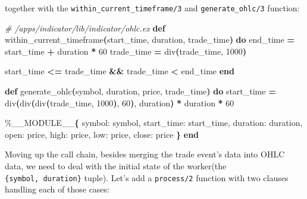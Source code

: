 \documentclass[
  oneside]{book}
\newenvironment{Shaded}{\begin{snugshade}}{\end{snugshade}}
\newcommand{\CommentTok}[1]{\textcolor[rgb]{0.56,0.35,0.01}{\textit{#1}}}
\newcommand{\ConstantTok}[1]{\textcolor[rgb]{0.56,0.35,0.01}{#1}}
\newcommand{\DecValTok}[1]{\textcolor[rgb]{0.00,0.00,0.81}{#1}}
\newcommand{\FunctionTok}[1]{\textcolor[rgb]{0.13,0.29,0.53}{\textbf{#1}}}
\newcommand{\KeywordTok}[1]{\textcolor[rgb]{0.13,0.29,0.53}{\textbf{#1}}}
\newcommand{\NormalTok}[1]{#1}
\newcommand{\OperatorTok}[1]{\textcolor[rgb]{0.81,0.36,0.00}{\textbf{#1}}}
\newcommand{\VariableTok}[1]{\textcolor[rgb]{0.00,0.00,0.00}{#1}}
\begin{document}
together with the \texttt{within\_current\_timeframe/3} and \texttt{generate\_ohlc/3} function:

\begin{Shaded}
\begin{Highlighting}[]
\CommentTok{\# /apps/indicator/lib/indicator/ohlc.ex}
  \KeywordTok{def}\NormalTok{ within\_current\_timeframe}\FunctionTok{(}\NormalTok{start\_time, duration, trade\_time}\FunctionTok{)} \KeywordTok{do}
\NormalTok{    end\_time }\OperatorTok{=}\NormalTok{ start\_time }\OperatorTok{+}\NormalTok{ duration }\OperatorTok{*} \DecValTok{60}
\NormalTok{    trade\_time }\OperatorTok{=}\NormalTok{ div}\FunctionTok{(}\NormalTok{trade\_time, }\DecValTok{1000}\FunctionTok{)}

\NormalTok{    start\_time }\OperatorTok{\textless{}=}\NormalTok{ trade\_time }\OperatorTok{\&\&}\NormalTok{ trade\_time }\OperatorTok{\textless{}}\NormalTok{ end\_time}
  \KeywordTok{end}
  
  \KeywordTok{def}\NormalTok{ generate\_ohlc}\FunctionTok{(}\NormalTok{symbol, duration, price, trade\_time}\FunctionTok{)} \KeywordTok{do}
\NormalTok{    start\_time }\OperatorTok{=}\NormalTok{ div}\FunctionTok{(}\NormalTok{div}\FunctionTok{(}\NormalTok{div}\FunctionTok{(}\NormalTok{trade\_time, }\DecValTok{1000}\FunctionTok{)}\NormalTok{, }\DecValTok{60}\FunctionTok{)}\NormalTok{, duration}\FunctionTok{)} \OperatorTok{*}\NormalTok{ duration }\OperatorTok{*} \DecValTok{60}

\NormalTok{    \%}\ConstantTok{\_\_MODULE\_\_}\FunctionTok{\{}
      \VariableTok{symbol:}\NormalTok{ symbol,}
      \VariableTok{start\_time:}\NormalTok{ start\_time,}
      \VariableTok{duration:}\NormalTok{ duration,}
      \VariableTok{open:}\NormalTok{ price,}
      \VariableTok{high:}\NormalTok{ price,}
      \VariableTok{low:}\NormalTok{ price,}
      \VariableTok{close:}\NormalTok{ price}
    \FunctionTok{\}}
  \KeywordTok{end}  
\end{Highlighting}
\end{Shaded}

Moving up the call chain, besides merging the trade event's data into OHLC data, we need to deal with the initial state of the worker(the \texttt{\{symbol,\ duration\}} tuple). Let's add a \texttt{process/2} function with two clauses handling each of those cases:
\end{document}
